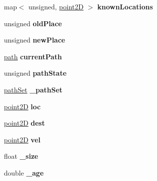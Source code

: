 \begin{DoxyCompactItemize}
\item 
\mbox{\label{classagent_a3b5f19fe489aeaa4a44365b80a20de50}} 
map$<$ unsigned, \mbox{\hyperlink{classpoint2D}{point2D}} $>$ {\bfseries known\+Locations}
\item 
\mbox{\label{classagent_adb1d1bc0cee97d9c4d3c68536e84f3f6}} 
unsigned {\bfseries old\+Place}
\item 
\mbox{\label{classagent_a14bacf305626b17d29eef5681f284f7a}} 
unsigned {\bfseries new\+Place}
\item 
\mbox{\label{classagent_ad7fc52cb970a53fb03f3a08f6e00c4de}} 
\mbox{\hyperlink{structpath}{path}} {\bfseries current\+Path}
\item 
\mbox{\label{classagent_ac297c591823cd9c23c8cdbcaea964344}} 
unsigned {\bfseries path\+State}
\item 
\mbox{\label{classagent_a51641f914b14e5c5be4fd6ea7a6f50f3}} 
\mbox{\hyperlink{structpathSet}{path\+Set}} {\bfseries \+\_\+path\+Set}
\item 
\mbox{\label{classagent_a625057d4c53fe2581f1c963d4da601ba}} 
\mbox{\hyperlink{classpoint2D}{point2D}} {\bfseries loc}
\item 
\mbox{\label{classagent_a1cf261bbb26132bbc68c0a7d920437f4}} 
\mbox{\hyperlink{classpoint2D}{point2D}} {\bfseries dest}
\item 
\mbox{\label{classagent_a5ff902fc713259415266ca26f2bb8ecb}} 
\mbox{\hyperlink{classpoint2D}{point2D}} {\bfseries vel}
\item 
\mbox{\label{classagent_aa029a96be166646fb046873a73d3fbdd}} 
float {\bfseries \+\_\+size}
\item 
\mbox{\label{classagent_a9c76eb9369864fb60a2d5a4f44c56843}} 
double {\bfseries \+\_\+age}
\item 
\mbox{\label{classagent_a6235c5897c39008af08d75fa7dca13b2}} 

\end{DoxyCompactItemize}
